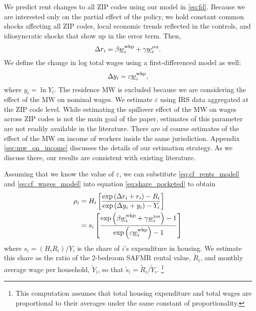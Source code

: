 We predict rent changes to all ZIP codes using our model in \eqref{eq:fd}.
Because we are interested only on the partial effect of the policy, we
hold constant common shocks affecting all ZIP codes,
local economic trends reflected in the controls, and
idiosyncratic shocks that show up in the error term.
Then,
\begin{equation}\label{eq:cf_rents_model}
    \Delta r_i = \beta \underline{w}_i^{\text{wkp}} + \gamma \underline{w}_i^{\text{res}} .
\end{equation}
We define the change in log total wages using a first-differenced model as well:
\begin{equation}\label{eq:cf_wages_model}
    \Delta y_i = \varepsilon \underline{w}_i^{\text{wkp}} ,
\end{equation}
where $y_i=\ln Y_i$.
The residence MW is excluded because we are considering the effect of the MW on 
nominal wages.
We estimate $\varepsilon$ using IRS data aggregated at the ZIP code level.
While estimating the spillover effect of the MW on wages across ZIP codes is 
not the main goal of the paper, 
estimates of this parameter are not readily available in the literature.
There are of course estimates of the effect of the MW on income of workers
inside the same jurisdiction.
Appendix \ref{sec:mw_on_income} discusses the details of our estimation 
strategy.
As we discuss there, our results are consistent with existing literature.

%
%
%

Assuming that we know the value of $\varepsilon$, we can substitute
\eqref{eq:cf_rents_model} and \eqref{eq:cf_wages_model} into equation
\eqref{eq:share_pocketed} to obtain
\begin{equation}\label{eq:rho}
    \begin{split}
        \rho_i & = H_i \left[ 
        \frac{\exp \left(\Delta r_i + r_i \right) - R_i }
             {\exp \left(\Delta y_i + y_i \right) - Y_i }
        \right] \\
        & = s_i \left[
            \frac{\exp \left( \beta \underline{w}_i^{\text{wkp}} + \gamma \underline{w}_i^{\text{res}} \right) - 1 }
                {\exp \left( \varepsilon \underline{w}_i^{\text{wkp}} \right) - 1 }
            \right]
    \end{split}
\end{equation}
where $s_i = \left(H_i R_i\right)/Y_i$ is the share of $i$'s expenditure in 
housing.
We estimate this share as the ratio of the 2-bedroom SAFMR rental value, 
$\tilde R_i$, and monthly average wage per household, $\tilde Y_i$,
so that $\tilde s_i = \tilde R_i/\tilde Y_i$.%
\footnote{This computation assumes that total housing expenditure and total
wages are proportional to their averages under the same constant of 
proportionality.}

